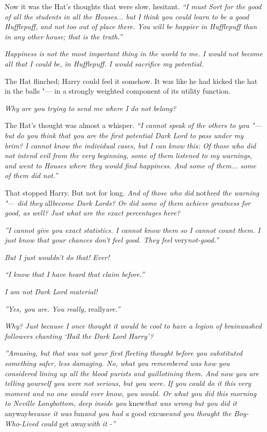 Now it was the Hat's thoughts that were slow, hesitant. \emph{``I must
Sort for the good of all the students in all the Houses... but I
think you could learn to be a good Hufflepuff, and not too out of place
there. You will be happier in Hufflepuff than in any other house; that
is the truth.''}

\emph{Happiness is not the most important thing in the world to me. I
would not become all that I could be, in Hufflepuff. I would sacrifice
my potential.}

The Hat flinched; Harry could feel it somehow. It was like he had kicked
the hat in the balls "--- in a strongly weighted component of its utility
function.

\emph{Why are you trying to send me where I do not belong?}

The Hat's thought was almost a whisper. \emph{``I cannot speak of the
others to you "--- but do you think that you are the first potential Dark
Lord to pass under my brim? I cannot know the individual cases, but I
can know this: Of those who did not intend evil from the very beginning,
some of them listened to my warnings, and went to Houses where they
would find happiness. And some of them... some of them did not.''}

That stopped Harry. But not for long. \emph{And of those who did}
not\emph{heed the warning "--- did they} all\emph{become Dark Lords? Or did
some of them achieve greatness for good, as well? Just what are the
exact percentages here?}

\emph{''I cannot give you exact statistics. I cannot know them so I
cannot count them. I just know that your chances don't feel good. They
feel} very\emph{not-good.''}

\emph{But I just wouldn't do that! Ever!}

\emph{``I know that I have heard that claim before.''}

\emph{I am not Dark Lord material!}

\emph{''Yes, you are. You really,} really\emph{are.''}

\emph{Why? Just because I once thought it would be cool to have a legion
of brainwashed followers chanting `Hail the Dark Lord Harry'?}

\emph{''Amusing, but that was not your first fleeting thought before you
substituted something safer, less damaging. No, what you remembered was
how you considered lining up all the blood purists and guillotining
them. And now you are telling yourself you were not serious, but you
were. If you could do it this very moment and no one would ever know,
you would. Or what you did this morning to Neville Longbottom, deep
inside you} knew\emph{that was wrong but you did it} anyway\emph{because
it was} fun\emph{and you had a} good excuse\emph{and you thought the
Boy-Who-Lived could} get away\emph{with it -''}

